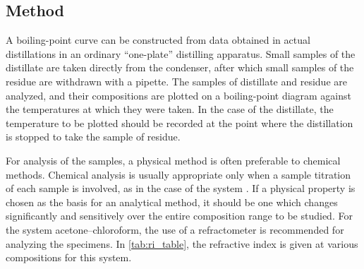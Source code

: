 \subsection{Method}
\label{subs:method}

A boiling-point curve can be constructed from data obtained in actual distillations in an ordinary ``one-plate'' distilling apparatus. 
Small samples of the distillate are taken directly from the condenser, after which small samples of the residue are withdrawn with a pipette. 
The samples of distillate and residue are analyzed, and their compositions are plotted on a boiling-point diagram against the temperatures at which they were taken. 
In the case of the distillate, the temperature to be plotted should be recorded at the point where the distillation is stopped to take the sample of residue. 

For analysis of the samples, a physical method is often preferable to chemical methods. 
Chemical analysis is usually appropriate only when a sample titration of each sample is involved, as in the case of the system . 
If a physical property is chosen as the basis for an analytical method, it should be one which changes significantly and sensitively over the entire composition range to be studied. 
For the system acetone--chloroform, the use of a refractometer is recommended for analyzing the specimens.
In \cref{tab:ri_table}, the refractive index is given at various compositions for this system. 

